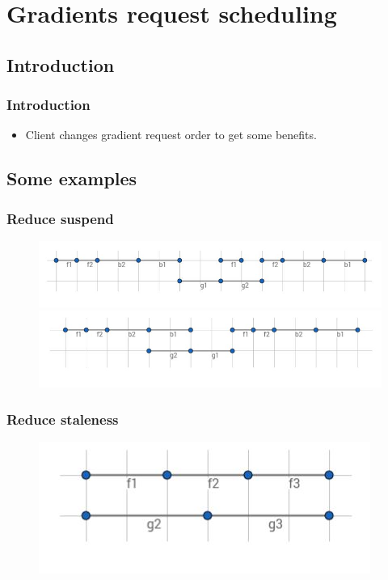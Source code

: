 \section{Gradients request scheduling}

\subsection{Introduction}
\begin{frame}
    \frametitle{Introduction}
	\begin{itemize}
		\item Client changes gradient request order to get some benefits.  
	\end{itemize}
\end{frame}


\subsection{Some examples}
\begin{frame}
    \frametitle{Reduce suspend}
    \begin{figure}
		\includegraphics[scale=0.4]{figure/reducesuspend.JPG}
		\includegraphics[scale=0.4]{figure/reducesuspend2.JPG}
	\end{figure}
\end{frame}

\begin{frame}
	\frametitle{Reduce staleness}
	\begin{figure}
		\includegraphics[scale=0.4]{figure/reducestaleness.JPG}
	\end{figure}
\end{frame}

